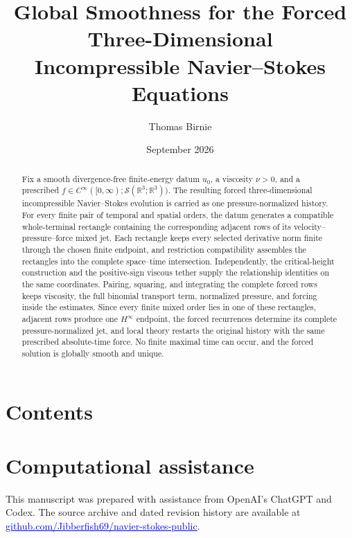 \documentclass[11pt]{article}
\title{Global Smoothness for the Forced Three-Dimensional\\
Incompressible Navier--Stokes Equations}
\author{Thomas Birnie}
\date{September 2026}
\makeatletter
\theoremstyle{definition}
\theoremstyle{remark}
\newcommand{\R}{\mathbb R}
\renewcommand\tableofcontents{%
  \section*{Contents}%
  \@mkboth{\MakeUppercase{Contents}}{\MakeUppercase{Contents}}%
  \@starttoc{toc}%
}
\makeatother
\begin{document}
\maketitle

\begin{abstract}
Fix a smooth divergence-free finite-energy datum \(u_0\), a viscosity
\(\nu>0\), and a prescribed
\(f\in C^\infty([0,\infty);\mathcal S(\R^3;\R^3))\).  The resulting forced
three-dimensional incompressible Navier--Stokes evolution is carried as one
pressure-normalized history.  For every finite pair of temporal and spatial
orders, the datum generates a compatible whole-terminal rectangle containing
the corresponding adjacent rows of its velocity--pressure--force mixed jet.
Each rectangle keeps every selected derivative norm finite through the chosen
finite endpoint, and restriction compatibility assembles the rectangles into
the complete space--time intersection.  Independently, the critical-height
construction and the positive-sign viscous tether supply the relationship
identities on the same coordinates.  Pairing, squaring, and integrating the
complete forced rows keeps viscosity, the full binomial transport term,
normalized pressure, and forcing inside the estimates.  Since every finite
mixed order lies in one of these rectangles, adjacent rows produce one
\(H^\infty\) endpoint, the forced recurrences determine its
complete pressure-normalized jet, and local theory restarts the original
history with the same prescribed absolute-time force.  No finite maximal time
can occur, and the forced solution is globally smooth and unique.
\end{abstract}
\clearpage

\begingroup
\small
\tableofcontents
\par\endgroup
\clearpage












\appendix
\QuantitativeCatalogue

\section*{Computational assistance}
This manuscript was prepared with assistance from OpenAI's ChatGPT and Codex.
The source archive and dated revision history are available at
\href{https://github.com/Jibberfish69/navier-stokes-public}{%
  \textcolor{blue}{\underline{github.com/Jibberfish69/navier-stokes-public}}}.
\end{document}
